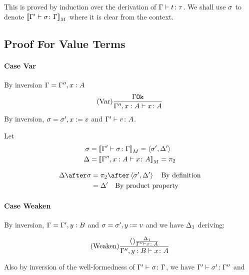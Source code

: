{    %
    This is proved by induction over the derivation of $\Gamma \vdash t \colon \tau$.
    We shall use $\sigma$ to denote ${\bf [\![}\Gamma' \vdash \sigma \colon \Gamma{\bf ]\!]}_M$ where it is clear from the context.
    \subsection{Proof For Value Terms}
    \paragraph{Case Var}
    By inversion $\Gamma = \Gamma'', x:A$
    \begin{equation}
        (\text{Var}) \frac{\Gamma \texttt{Ok}}{\Gamma'', x:A \vdash x \colon A}
    \end{equation}
    By inversion, $\sigma = \sigma', x:= v$ and $\Gamma' \vdash v \colon A$.

    Let 
    \begin{align}
        \sigma &={\bf [\![}\Gamma' \vdash \sigma \colon \Gamma{\bf ]\!]}_M = \left\langle\sigma', \Delta'\right\rangle\\
        \Delta &={\bf [\![}\Gamma'', x:A \vdash x \colon A{\bf ]\!]}_M = \pi_2\\
    \end{align}

    \begin{align}
        \D\after\si &= \pp\after\pr{\si'}{\D'}\qt{By definition}\\
        &= \D'\qt{By product property}
    \end{align}
    \paragraph{Case Weaken}
    By inversion, $\Gamma = \Gamma', y:B$ and $\sigma = \sigma', y:= v$
    and we have $\Delta_1$ deriving:

    \begin{equation}
        (\text{Weaken}) \frac{(\text{}) \frac{\Delta_1}{\Gamma'' \vdash x \colon A}}{\Gamma'',y: B \vdash x \colon A}
    \end{equation}

    Also by inversion of the well-formedness of $\Gamma' \vdash \sigma \colon \Gamma$, we have $\Gamma' \vdash \sigma' \colon \Gamma''$ and 
    
}
